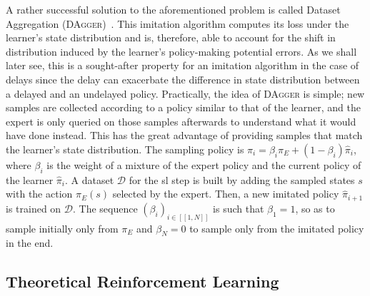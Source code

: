 A rather successful solution to the aforementioned problem is called Dataset Aggregation (\textsc{DAgger})~\cite{ross2011reduction}. 
This imitation algorithm computes its loss under the learner's state distribution \cite{osa2018algorithmic} and is, therefore, able to account for the shift in distribution induced by the learner's policy-making potential errors. 
As we shall later see, this is a sought-after property for an imitation algorithm in the case of delays since the delay can exacerbate the difference in state distribution between a delayed and an undelayed policy.
Practically, the idea of \textsc{DAgger} is simple; new samples are collected according to a policy similar to that of the learner, and the expert is only queried on those samples afterwards to understand what it would have done instead.
This has the great advantage of providing samples that match the learner's state distribution.  
The sampling policy is $\pi_i = \beta_i \pi_E + (1-\beta_i) \hat{\pi}_i$, where $\beta_i$ is the weight of a mixture of the expert policy and the current policy of the learner $\hat{\pi}_i$. 
A dataset $\mathcal{D}$ for the \gls{sl} step is built by adding the sampled states $s$ with the action $\pi_E(s)$ selected by the expert. 
Then, a new imitated policy $\hat{\pi}_{i+1}$ is trained on $\mathcal{D}$. 
The sequence $(\beta_i)_{i\in[\![1,N]\!]}$ is such that $\beta_1=1$, so as to sample initially only from $\pi_E$ and $\beta_N=0$ to sample only from the imitated policy in the end. 


\subsection{Theoretical Reinforcement Learning}
\label{subsec:theoretical_rl}

